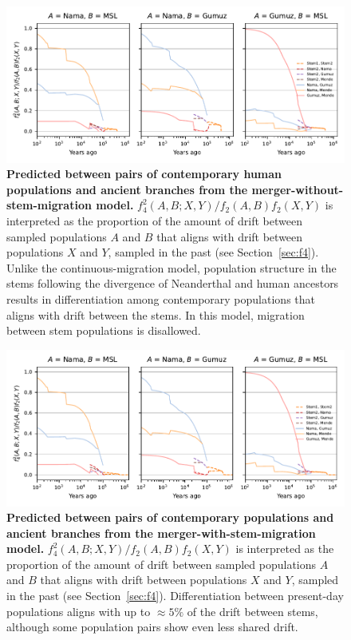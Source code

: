 \documentclass[]{article}
\begin{document}
\begin{figure}[ht]
    \centering
    \includegraphics{figures/supp-f4s-merger-without-stem-migration.pdf}
    \caption{
        \textbf{Predicted  between pairs of contemporary human populations
        and ancient branches from the merger-without-stem-migration model.}
        $f_4^2(A, B; X, Y)/f_2(A, B)f_2(X, Y)$ is interpreted as the proportion of the
        amount of drift between sampled populations $A$ and $B$ that aligns with
        drift between populations $X$ and $Y$, sampled in the past
        (see Section~\ref{sec:f4}).
        Unlike the continuous-migration model, population structure in the stems
        following the divergence of Neanderthal and human ancestors results
        in differentiation among contemporary populations that aligns with drift
        between the stems. In this model, migration between stem populations
        is disallowed.
    }
    \label{fig:supp-f4s-merger-without-stem-migration}
\end{figure}

\begin{figure}[ht]
    \centering
    \includegraphics{figures/supp-f4s-merger-with-stem-migration.pdf}
    \caption{
        \textbf{Predicted  between pairs of contemporary populations
        and ancient branches from the merger-with-stem-migration model.}
        $f_4^2(A, B; X, Y)/f_2(A, B)f_2(X, Y)$ is interpreted as the proportion of the
        amount of drift between sampled populations $A$ and $B$ that aligns with
        drift between populations $X$ and $Y$, sampled in the past
        (see Section~\ref{sec:f4}).
        Differentiation between present-day populations aligns with
        up to $\approx 5\%$ of the drift between stems, although some
        population pairs show even less shared drift.
    }
    \label{fig:supp-f4s-merger-with-stem-migration}
\end{figure}
\end{document}

